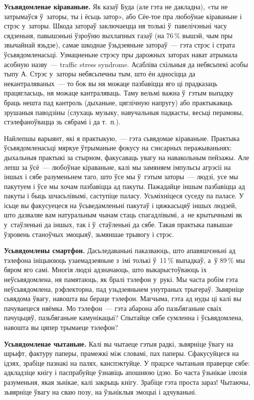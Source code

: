 \textbf{Усьвядомленае кіраваньне.} Як казаў Буда (але гэта не дакладна), «ты не затрымаўся ў~заторы, ты і ёсьць затор», або Сёе-тое пра любоўнае кіраваньне і стрэс у~заторы. Шкода затораў заключаецца ня толькі ў~павелічэньні часу сядзеньня, павышэньні ўзроўню выхлапных газаў (на 76\,\% вышэй, чым пры звычайнай язьдзе), самае шкоднае ўзьдзеяньне затораў~--- гэта стрэс і страта ўсьвядомленасьці. Узмацненьне стрэсу пры дарожных заторах нават атрымала асобную назву~--- traffic stress syndrome. Асабліва схільныя да небясьпекі асобы тыпу А. Стрэс у~заторы небясьпечны тым, што ён адносіцца да некантраляваных~--- то бок вы ня можаце пазбавіцца яго ці прадказаць працягласьць, ня можаце кантраляваць. Таму вельмі важна ў~гэтым выпадку браць нешта пад кантроль (дыханьне, цяглічную напругу) або практыкаваць зрушаныя паводзіны (слухаць музыку, навучальныя падкасты, весьці перамовы, стэлефаноўвацца зь сябрамі і да т.~п.).

Найлепшы варыянт, які я практыкую,~--- гэта сьвядомае кіраваньне. Практыка ўсьвядомленасьці мяркуе ўтрыманьне фокусу на сэнсарных перажываньнях: дыхальныя практыкі за стырном, факусаваць увагу на навакольным пейзажы. Але лепш за ўсё~--- любоўнае кіраваньне, калі мы замяняем імпульсы агрэсіі на іншых і сябе разуменьнем таго, што ўсе мы ў~гэтым заторы~--- людзі, усе мы пакутуем і ўсе мы хочам пазбавіцца ад пакуты. Пажадайце іншым пазбавіцца ад пакуты і быць шчасьлівымі, саступіце паласу. Усьміхніцеся суседу па паласе. У ісьце вы факусуецеся на ўсьведамленьні пакутаў і цяжкасьцяў іншых людзей, што дазваляе вам натуральным чынам стаць спагадлівымі, а~не крытычнымі як у~стаўленьні да іншых, так і ў~стаўленьні да сябе. Такая практыка павышае ўзровень станоўчых эмоцыяў, зьмяншае трывогу і стрэс.

\textbf{Усьвядомлены смартфон.} Дасьледаваньні паказваюць, што апавяшчэньні ад тэлефона ініцыююць узаемадзеяньне з~імі толькі ў~11\,\% выпадкаў, а~ў 89\,\% мы бяром яго самі. Многія людзі адзначаюць, што выкарыстоўваюць іх неўсьвядомлена, ня памятаюць, як бралі тэлефон у~рукі. Мы часта робім гэта неўсьвядомлена, рэфлекторна, пад узьдзеяньнем унутраных трыгераў. Зьвярніце сьвядома ўвагу, навошта вы бераце тэлефон. Магчыма, гэта ад нуды ці калі вы пачуваецеся няёмка. Мо тэлефон~--- гэта абарона або пазьбяганьне сваіх пачуцьцяў, пазьбяганьне камунікацыі? Спытайце сябе сумленна і ўсьвядомлена, навошта вы цяпер трымаеце тэлефон?

\textbf{Усьвядомленае чытаньне.} Калі вы чытаеце гэтыя радкі, зьвярніце ўвагу на шрыфт, фактуру паперы, прамежкі між словамі, пах паперы. Сфакусуйцеся на ідэях, зрабіце пазнакі на палях, канспэктуйце. У працэсе чытаньня праверце сябе: адкладзіце кнігу і паспрабуйце ўзнавіць апошнюю ідэю. Бо часта ўзьнікае ілюзія разуменьня, якая зьнікае, калі закрыць кнігу. Зрабіце гэта проста зараз! Чытаючы, зьвярніце ўвагу на сваю позу, на ўзьніклыя эмоцыі і адчуваньні.

